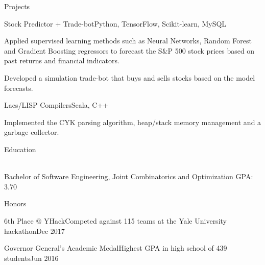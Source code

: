 \documentclass{resume} %
\begin{document}

\begin{rSection}{Projects}

\begin{projSec}{Stock Predictor + Trade-bot}{}{Python, TensorFlow, Scikit-learn, MySQL \href{https://github.com/UWCESEDUO/stock-prediction}{\space\faGithub}}
\item Applied supervised learning methods such as Neural Networks, Random Forest and Gradient Boosting regressors to forecast the S\&P 500 stock prices based on past returns and financial indicators.
\item Developed a simulation trade-bot that buys and sells stocks based on the model forecasts.
\end{projSec}

\begin{projSec}{Lacs/LISP Compilers}{}{Scala, C++ \href{https://github.com/jsun98/SchemePlusPlus}{\space\faGithub}}
\item Implemented the CYK parsing algorithm, heap/stack memory management and a garbage collector.
\end{projSec}

\end{rSection}



\begin{rSection}{Education}

\vspace{-1em}
\\ Bachelor of Software Engineering, Joint Combinatorics and Optimization \hfill {GPA: 3.70 }

\end{rSection}


\begin{rSection}{Honors}

\begin{honorSec}{6th Place @ YHack}{Competed against 115 teams at the Yale University hackathon}{Dec 2017}\end{honorSec}
\begin{honorSec}{Governor General's Academic Medal}{Highest GPA in high school of 439 students}{Jun 2016}\end{honorSec}
\vspace{1em} 

\end{rSection}
\end{document}
